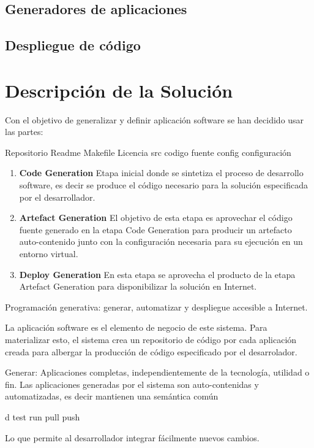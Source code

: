 \documentclass[a4paper,11pt]{book}
\begin{document}
\section{Generadores de aplicaciones}
\section{Despliegue de código}
 

\chapter{Descripción de la Solución}


Con el objetivo de generalizar y definir aplicación software se han decidido usar las partes:

Repositorio
Readme
Makefile
Licencia
src codigo fuente
config configuración


\begin{enumerate}
\item \textbf{ Code Generation }  Etapa inicial donde se sintetiza el proceso de desarrollo software, es decir se produce el código necesario para la solución especificada por el desarrollador. 
\item \textbf{ Artefact Generation }  El objetivo de esta etapa es aprovechar el código fuente generado en la etapa Code Generation para producir un artefacto auto-contenido junto con la configuración necesaria para su ejecución en un entorno virtual. 
\item \textbf{ Deploy Generation } En esta etapa se aprovecha el producto de la etapa Artefact Generation para disponibilizar la solución en Internet. 
\end{enumerate}


Programación generativa: generar, automatizar  y despliegue accesible a Internet.


La aplicación software es el elemento de negocio de este sistema.  Para materializar esto, el sistema crea un repositorio de código por cada aplicación creada para albergar la producción de código especificado por  el desarrolador. 


Generar: Aplicaciones completas, independientemente de la tecnología, utilidad o fin. Las aplicaciones generadas por el sistema
son auto-contenidas y automatizadas, es decir mantienen una semántica común 




d
test
run
pull
push

Lo que permite al desarrollador integrar fácilmente nuevos cambios. 
\end{document}
